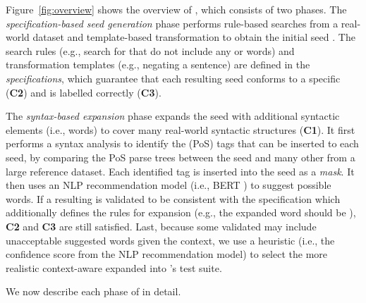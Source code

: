 Figure~\ref{fig:overview} shows the overview of \tool{}, which
consists of two phases.  The \emph{specification-based seed
  generation} phase performs rule-based searches from a real-world
dataset and template-based transformation to obtain the initial seed
\sents.  The search rules (e.g., search for \neu \sents that do not
include any \pstv or \ngtv words) and transformation templates (e.g.,
negating a sentence) are defined in the \emph{\lc specifications},
which guarantee that each resulting seed conforms to a specific \lc
({\bf C2}) and is labelled correctly ({\bf C3}).

The \emph{syntax-based \sent expansion} phase expands the seed \sents
with additional syntactic elements (i.e., words) to cover many
real-world syntactic structures ({\bf C1}). It first performs a syntax
analysis to identify the \pos (PoS) tags that can be inserted to each
seed, by comparing the PoS parse trees between the seed \sent and many
other \sents from a large reference dataset. Each identified tag is
inserted into the seed as a \emph{mask}. It then uses an NLP
recommendation model (i.e., BERT \cite{}) to suggest possible
words. If a resulting \sent is validated to be consistent with the
specification which additionally defines the rules for expansion
(e.g., the expanded word should be \neu), {\bf C2} and {\bf C3} are
still satisfied. Last, because some validated \sents may include
unacceptable suggested words given the context, we use a heuristic
(i.e., the confidence score from the NLP recommendation model) to
select the more realistic context-aware expanded \sents into \tool{}'s
test suite.

We now describe each phase of \tool{} in detail.


